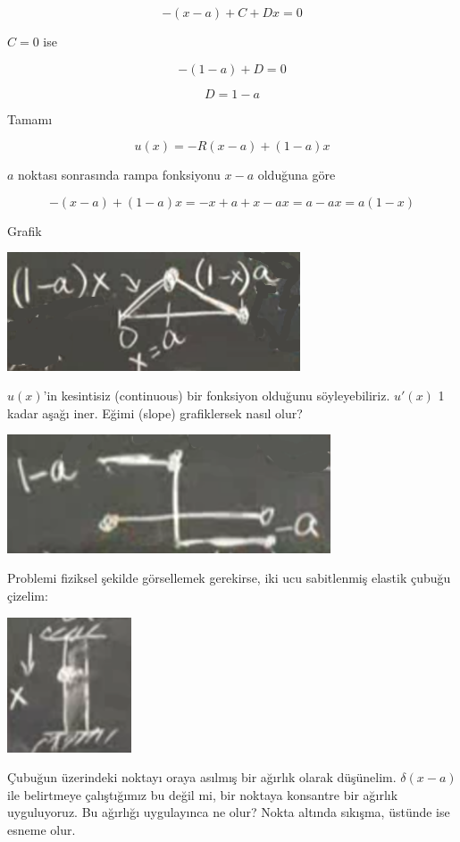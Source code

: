 \documentclass[12pt,fleqn]{article}\usepackage{../../common}
\begin{document}
$$ -(x-a)+C+Dx = 0 $$

$C = 0$ ise

$$ -(1-a) + D = 0 $$

$$ D = 1-a $$

Tamamı

$$ u(x) = -R(x-a) + (1-a)x $$

$a$ noktası sonrasında rampa fonksiyonu $x-a$ olduğuna göre

$$ -(x-a) + (1-a)x = -x + a + x -ax = a - ax = a(1-x)$$

Grafik

\includegraphics[height=3.5cm]{4_7.png}

$u(x)$'in kesintisiz (continuous) bir fonksiyon olduğunu
söyleyebiliriz. $u'(x)$ 1 kadar aşağı iner. Eğimi (slope) grafiklersek
nasıl olur?

\includegraphics[height=3.5cm]{4_8.png}

Problemi fiziksel şekilde görsellemek gerekirse, iki ucu sabitlenmiş
elastik çubuğu çizelim:

\includegraphics[height=4cm]{4_9.png}

Çubuğun üzerindeki noktayı oraya asılmış bir ağırlık olarak
düşünelim. $\delta(x-a)$ ile belirtmeye çalıştığımız bu değil mi, bir
noktaya konsantre bir ağırlık uyguluyoruz. Bu ağırlığı uygulayınca ne olur?
Nokta altında sıkışma, üstünde ise esneme olur. 
\end{document}
